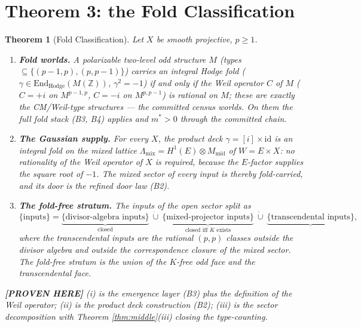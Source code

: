 \documentclass[11pt]{article}
\newtheorem{theorem}{Theorem}
\newcommand{\PROVEN}{\textbf{[PROVEN HERE]}}
\newcommand{\Z}{\mathbb{Z}}
\newcommand{\End}{\mathrm{End}}
\begin{document}
\section{Theorem 3: the Fold Classification}

\begin{theorem}[Fold Classification]\label{thm:fold}
Let $X$ be smooth projective, $p\ge1$.
\begin{enumerate}[label=(\roman*)]
\item \textbf{Fold worlds.} A polarizable two-level odd structure
$M$ (types $\subseteq\{(p-1,p),(p,p-1)\}$) carries an integral Hodge fold
($\gamma\in\End_{\mathrm{Hodge}}(M(\Z))$, $\gamma^2=-1$) if and only if the
Weil operator $C$ of $M$ ($C=+i$ on $M^{p-1,p}$, $C=-i$ on $M^{p,p-1}$) is
rational on $M$; these are exactly the CM/Weil-type structures --- the
committed census worlds. On them the full fold stack (B3, B4) applies and
$m^*>0$ through the committed chain.
\item \textbf{The Gaussian supply.} For \emph{every} $X$, the product deck
$\gamma=[i]\times\mathrm{id}$ is an integral fold on the mixed lattice
$\Lambda_{\mathrm{mix}}=H^1(E)\otimes M_{\mathrm{mid}}$ of $W=E\times X$:
no rationality of the Weil operator of $X$ is required, because the
$E$-factor supplies the square root of $-1$. The mixed sector of every input
is thereby fold-carried, and its door is the refined door law (B2).
\item \textbf{The fold-free stratum.} The inputs of the open sector split as
\[
\{\text{inputs}\}
=\underbrace{\{\text{divisor-algebra inputs}\}}_{\text{closed}}
\ \dot\cup\
\underbrace{\{\text{mixed-projector inputs}\}}_{\text{closed iff }K\text{ exists}}
\ \dot\cup\
\underbrace{\{\text{transcendental inputs}\}},
\]
where the transcendental inputs are the rational $(p,p)$ classes outside the
divisor algebra and outside the correspondence closure of the mixed sector.
The fold-free stratum is the union of the $K$-free odd face and the
transcendental face.
\end{enumerate}
\PROVEN{} (i) is the emergence layer (B3) plus the definition of the Weil
operator; (ii) is the product deck construction (B2); (iii) is the sector
decomposition with Theorem \ref{thm:middle}(iii) closing the type-counting.
\end{theorem}
\end{document}

